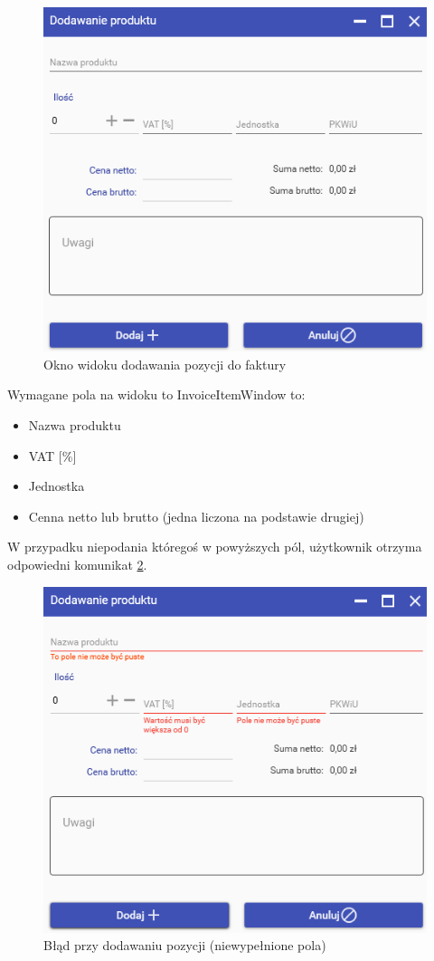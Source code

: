 \begin{figure}[ht!]
\centering
  \includegraphics[width=\linewidth]{Rysunki/InvoiceItem/InvoiceItemWindow.png}
  \caption{Okno widoku dodawania pozycji do faktury}
  \label{fig:InvoiceItemWindow}
\end{figure}

Wymagane pola na widoku to InvoiceItemWindow to: 
\begin{itemize}
    \item Nazwa produktu
    \item VAT [\%]
    \item Jednostka
    \item Cenna netto lub brutto (jedna liczona na podstawie drugiej)
\end{itemize}

\newpage
W przypadku niepodania któregoś w powyższych pól, użytkownik otrzyma odpowiedni komunikat \ref{fig:InvoiceItemWindowError}.

\begin{figure}[ht!]
\centering
  \includegraphics[width=\linewidth]{Rysunki/InvoiceItem/InvoiceItemWindowError.png}
  \caption{Błąd przy dodawaniu pozycji (niewypełnione pola)}
  \label{fig:InvoiceItemWindowError}
\end{figure}